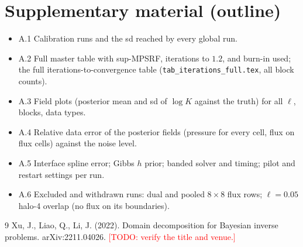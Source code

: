 \documentclass[11pt]{article}
\newcommand{\todo}[1]{\textcolor{red}{[TODO: #1]}}
\begin{document}
\section{Supplementary material (outline)}
\begin{itemize}
\item A.1 Calibration runs and the sd reached by every global run. 
\item A.2 Full master table with sup-MPSRF, iterations to $1.2$, and burn-in used; the full iterations-to-convergence table (\texttt{tab\_iterations\_full.tex}, all block counts).
\item A.3 Field plots (posterior mean and sd of $\log K$ against the truth) for all $\ell$, blocks, data types.
\item A.4 Relative data error of the posterior fields (pressure for every cell, flux on flux cells) against the noise level.
\item A.5 Interface spline error; Gibbs $h$ prior; banded solver and timing; pilot and restart settings per run.
\item A.6 Excluded and withdrawn runs: dual and pooled $8\times8$ flux rows; $\ell=0.05$ halo-4 overlap (no flux on its boundaries).
\end{itemize}


\begin{thebibliography}{9}
 Xu, J., Liao, Q., Li, J. (2022). Domain decomposition for Bayesian inverse problems. arXiv:2211.04026. \todo{verify the title and venue.}
\end{thebibliography}
\end{document}
